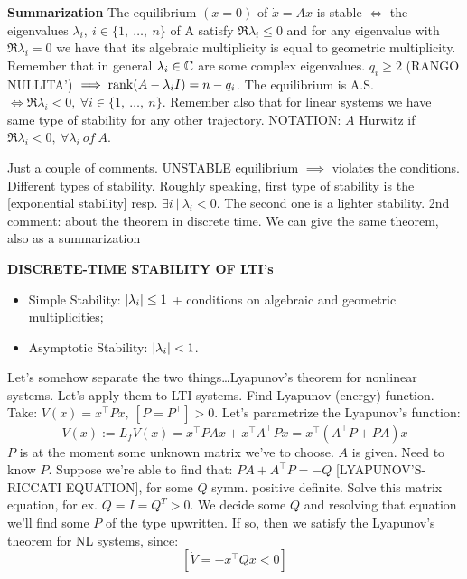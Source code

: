 \begin{thrm}{\textbf{Summarization}} \newline
The equilibrium $(x=0)$ of $\dot{x}=Ax$ is stable $\iff$ the eigenvalues $\lambda_i,\ i \in \{1,\ \dots,\ n\}$ of A satisfy $\Re{\lambda_i} \leq 0$ and for any eigenvalue with $\Re{\lambda_i} = 0$ we have that its algebraic multiplicity is equal to geometric multiplicity. Remember that in general $\lambda_i \in \mathbb{C}$ are some complex eigenvalues. $q_i \geq 2$ (RANGO NULLITA') $\implies \operatorname{rank}(A-\lambda_iI) = n - q_i$.
The equilibrium is A.S. $\iff \Re{\lambda_i} < 0,\ \forall i \in \{1,\ \dots,\ n\}$. Remember also that for linear systems we have same type of stability for any other trajectory. NOTATION: $A$ Hurwitz if $\Re{\lambda_i} < 0,\ \forall \lambda_i\ of\ A$. 
\end{thrm}

Just a couple of comments. UNSTABLE equilibrium $\implies$ violates the conditions. Different types of stability. Roughly speaking, first type of stability is the [exponential stability] resp. $\exists i\ |\ \lambda_i < 0$. The second one is a lighter stability. 2nd comment: about the theorem in discrete time. We can give the same theorem, also as a summarization

\begin{thrm}{\textbf{DISCRETE-TIME STABILITY OF LTI's}}
\begin{itemize}
\item Simple Stability: $\lvert\lambda_i\rvert \leq 1$ + conditions on algebraic and geometric multiplicities;
\item Asymptotic Stability: $\lvert\lambda_i\rvert < 1$.
\end{itemize}
\end{thrm}

Let's somehow separate the two things\dots Lyapunov's theorem for nonlinear systems. Let's apply them to LTI systems. Find Lyapunov (energy) function. Take: $V(x)=x^\top Px,\ [P=P^\top]>0$. Let's parametrize the Lyapunov's function:
\[
	\dot{V}(x) := L_fV(x) = x^\top PAx + x^\top A^\top Px = x^\top(A^\top P + PA)x
\]
$P$ is at the moment some unknown matrix we've to choose. $A$ is given. Need to know $P$. Suppose we're able to find that: $PA + A^\top P = -Q$ [LYAPUNOV'S-RICCATI EQUATION], for some $Q$ symm. positive definite. Solve this matrix equation, for ex. $Q=I=Q^T > 0$. We decide some $Q$ and resolving that equation we'll find some $P$ of the type upwritten. If so, then we satisfy the Lyapunov's theorem for NL systems, since:
\[	
	[\dot{V} = -x^\top Qx < 0]
\]

